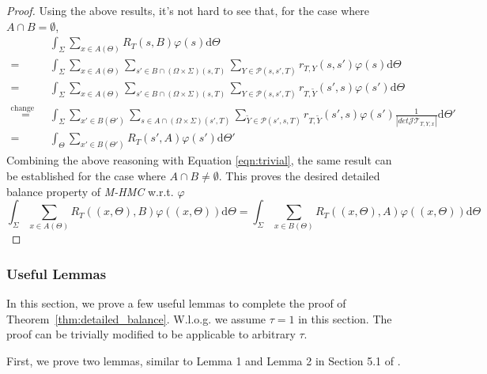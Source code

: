 \documentclass{article}
\begin{document}
\begin{proof}
Using the above results, it's not hard to see that, for the case where $A\cap B = \emptyset$,
\begin{align*}
   & \int_{\Sigma} \sum_{x \in A (\Theta)} R_T (s, B) \varphi (s) \mathrm{d} \Theta\\
	= & \int_{\Sigma}\sum_{x \in A (\Theta)} \sum_{s' \in B\cap(\Omega\times\Sigma)(s, T)}\sum_{Y\in\mathcal{P}(s, s', T)} r_{T, Y} (s, s') \varphi (s) \mathrm{d} \Theta\\
	= & \int_{\Sigma} \sum_{x \in A (\Theta)} \sum_{s' \in B \cap(\Omega\times\Sigma)(s, T)} \sum_{Y\in\mathcal{P}(s, s', T)} r_{T, \tilde{Y}} (s', s) \varphi (s')  \mathrm{d} \Theta\\
	\stackrel{\text{change of variables}}{=} & \int_{\Sigma}\sum_{x' \in B (\Theta')} \sum_{s \in A \cap(\Omega\times\Sigma)(s', T)} \sum_{\tilde{Y}\in\mathcal{P}(s', s, T)} r_{T, \tilde{Y}} (s', s) \varphi (s') \frac{1}{|det \mathcal{J}\mathcal{T}_{T, Y, x}|}\mathrm{d} \Theta'\\
   = & \int_{\Theta} \sum_{x' \in B (\Theta')} R_T (s', A) \varphi (s') \mathrm{d} \Theta' 
\end{align*}
Combining the above reasoning with Equation \ref{eqn:trivial}, the same result can be established for the case where $A\cap B \neq \emptyset$. This proves the desired detailed balance property of \textit{M-HMC} w.r.t. $\varphi$
\begin{equation*}
 \int_{\Sigma} \sum_{x \in A (\Theta)} R_T ((x, \Theta), B) \varphi ((x, \Theta))  \mathrm{d} \Theta
 = \int_{\Sigma} \sum_{x \in B (\Theta)} R_T ((x, \Theta), A) \varphi ((x, \Theta))  \mathrm{d}\Theta
\end{equation*}
\end{proof}

\subsubsection{Useful Lemmas}

In this section, we prove a few useful lemmas to complete the proof of Theorem~\ref{thm:detailed_balance}. W.l.o.g. we assume $\tau=1$ in this section. The proof can be trivially modified to be applicable to arbitrary $\tau$.

First, we prove two lemmas, similar to Lemma 1 and Lemma 2 in Section 5.1 of \cite{Mohasel_Afshar2015-uh}.
\end{document}
